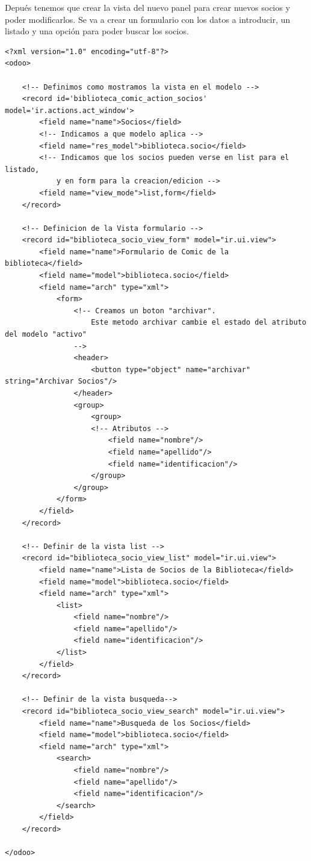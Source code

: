 \documentclass[a4paper,12pt]{article}
\begin{document}
Depués tenemos que crear la vista del nuevo panel para crear nuevos socios y poder modificarlos. Se va a crear un formulario con los datos a introducir, un listado y una opción para poder buscar los socios.

\vspace{0.5cm}
\begin{lstlisting}[style=javascript]
<?xml version="1.0" encoding="utf-8"?>
<odoo>

    <!-- Definimos como mostramos la vista en el modelo -->
    <record id='biblioteca_comic_action_socios' model='ir.actions.act_window'>
        <field name="name">Socios</field>
        <!-- Indicamos a que modelo aplica -->
        <field name="res_model">biblioteca.socio</field>
        <!-- Indicamos que los socios pueden verse en list para el listado,
            y en form para la creacion/edicion -->
        <field name="view_mode">list,form</field>
    </record>

    <!-- Definicion de la Vista formulario -->
    <record id="biblioteca_socio_view_form" model="ir.ui.view">
        <field name="name">Formulario de Comic de la biblioteca</field>
        <field name="model">biblioteca.socio</field>
        <field name="arch" type="xml">
            <form>
                <!-- Creamos un boton "archivar". 
                    Este metodo archivar cambie el estado del atributo del modelo "activo"
                -->
                <header>
                    <button type="object" name="archivar" string="Archivar Socios"/>
                </header>
                <group>
                    <group>
                    <!-- Atributos -->
                        <field name="nombre"/>
                        <field name="apellido"/>
                        <field name="identificacion"/>
                    </group>
                </group>
            </form>
        </field>
    </record>

    <!-- Definir de la vista list -->
    <record id="biblioteca_socio_view_list" model="ir.ui.view">
        <field name="name">Lista de Socios de la Biblioteca</field>
        <field name="model">biblioteca.socio</field>
        <field name="arch" type="xml">
            <list>
                <field name="nombre"/>
                <field name="apellido"/>                        
                <field name="identificacion"/>
            </list>
        </field>
    </record>

    <!-- Definir de la vista busqueda-->
    <record id="biblioteca_socio_view_search" model="ir.ui.view">
        <field name="name">Busqueda de los Socios</field>
        <field name="model">biblioteca.socio</field>
        <field name="arch" type="xml">
            <search>
                <field name="nombre"/>
                <field name="apellido"/>
                <field name="identificacion"/>
            </search>
        </field>
    </record>

</odoo>
\end{lstlisting}
\end{document}
